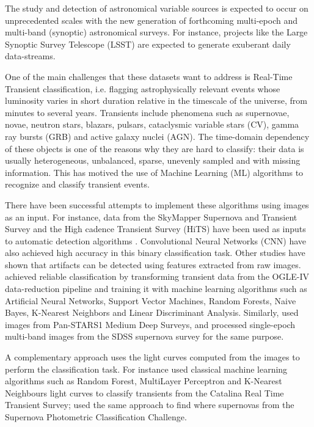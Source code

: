 \documentclass[a4paper,fleqn,usenatbib]{mnras}
\begin{document}
The study and detection of astronomical variable sources is expected
to occur on unprecedented scales with the new generation of
forthcoming multi-epoch and multi-band (synoptic) astronomical
surveys. 
For instance, projects like the Large Synoptic Survey Telescope
(LSST)  \citep{0805.2366,1512.07914} are expected to generate
exuberant daily data-streams.   


One of the main challenges that these datasets want to address is
Real-Time Transient classification, i.e. flagging astrophysically
relevant events whose luminosity varies in short duration relative in
the timescale of the universe, from minutes to several years.  
Transients include phenomena such as supernovae, novae, neutron
stars, blazars, pulsars, cataclysmic variable stars (CV), gamma ray
bursts (GRB) and active galaxy nuclei (AGN). 
The time-domain dependency of these objects is one of the reasons why
they are hard to classify: their data is usually heterogeneous,
unbalanced, sparse, unevenly sampled and with missing information. 
This has motived the use of Machine Learning (ML) algorithms to recognize
and classify transient events. 

There have been successful attempts to implement these algorithms
using images as an input.
For instance, data from the SkyMapper Supernova and Transient
Survey and the High cadence Transient Survey (HiTS) have been used as
inputs to automatic detection algorithms \citep{1708.08947,1701.00458}.
Convolutional Neural Networks (CNN) have also achieved
high accuracy in this binary classification task.
Other studies have shown that artifacts can be detected using
features extracted from raw images. 
\cite{1601.06320} achieved reliable
classification by transforming transient data from the OGLE-IV
data-reduction pipeline and training it with machine learning
algorithms such as Artificial Neural Networks, Support Vector
Machines, Random Forests, Naive Bayes, K-Nearest Neighbors and Linear
Discriminant Analysis.  
Similarly, \cite{1501.05470} used images from Pan-STARS1 Medium Deep
Surveys, and \cite{1407.4118} processed single-epoch multi-band images
from the SDSS supernova survey for the same purpose.  


A complementary approach uses the light curves computed from the
images to perform the classification task.
For instance \cite{1601.03931} used classical machine learning
algorithms such as Random Forest, MultiLayer Perceptron and K-Nearest Neighbours
light curves to classify transients from the Catalina Real Time
Transient Survey; \cite{1603.00882} used the same approach to find
where supernovas from the Supernova Photometric Classification
Challenge.
\end{document}

